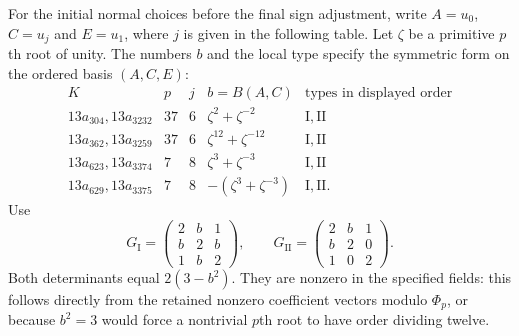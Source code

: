 \documentclass[11pt]{article}
\begin{document}
For the initial normal choices before the final sign adjustment, write
$A=u_0$, $C=u_j$ and $E=u_1$, where $j$ is given in the following
table. Let $\zeta$ be a primitive $p$th root of unity.
The numbers $b$ and the local type specify the symmetric form on the
ordered basis $(A,C,E)$:
\[
\begin{array}{c|c|c|c|c}
K&p&j&b=B(A,C)&\text{types in displayed order}\\\hline
13a_{304},13a_{3232}&37&6&\zeta^2+\zeta^{-2}&\mathrm I,\mathrm{II}\\
13a_{362},13a_{3259}&37&6&\zeta^{12}+\zeta^{-12}&\mathrm I,\mathrm{II}\\
13a_{623},13a_{3374}&7&8&\zeta^3+\zeta^{-3}&\mathrm I,\mathrm{II}\\
13a_{629},13a_{3375}&7&8&-(\zeta^3+\zeta^{-3})&\mathrm I,\mathrm{II}.
\end{array}
\]
Use
\begin{equation}\label{eq:gram}
 G_{\mathrm I}=\begin{pmatrix}2&b&1\\b&2&b\\1&b&2\end{pmatrix},
 \qquad
 G_{\mathrm{II}}=\begin{pmatrix}2&b&1\\b&2&0\\1&0&2\end{pmatrix}.
\end{equation}
Both determinants equal $2(3-b^2)$. They are nonzero in the specified
fields: this follows directly from the retained nonzero coefficient
vectors modulo $\Phi_p$, or because $b^2=3$ would force a nontrivial
$p$th root to have order dividing twelve.
\end{document}
